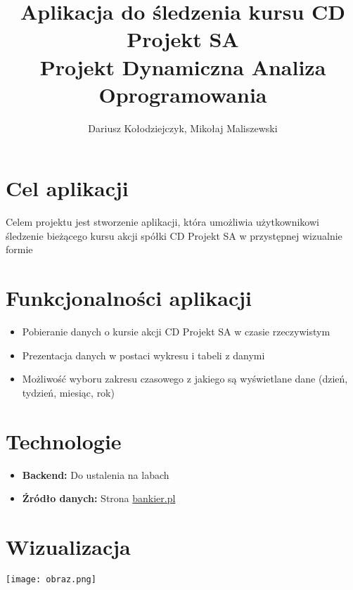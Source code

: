 \documentclass{article}
\begin{document}
		\title{Aplikacja do śledzenia kursu CD Projekt SA \\ Projekt Dynamiczna Analiza Oprogramowania}
	\author{Dariusz Kołodziejczyk, Mikołaj Maliszewski}
	\maketitle
	\section{Cel aplikacji}
	\noindent Celem projektu jest stworzenie aplikacji, która umożliwia użytkownikowi śledzenie bieżącego kursu akcji spółki CD Projekt SA w przystępnej wizualnie formie
	\section{Funkcjonalności aplikacji}
	\begin{itemize}
		\item Pobieranie danych o kursie akcji CD Projekt SA w czasie rzeczywistym
		\item Prezentacja danych w postaci wykresu i tabeli z danymi
		\item Możliwość wyboru zakresu czasowego z jakiego są wyświetlane dane (dzień, tydzień, miesiąc, rok)
	\end{itemize}
	\section{Technologie}
	\begin{itemize}
		\item \textbf {Backend:} Do ustalenia na labach
		\item \textbf{Źródło danych:} Strona \href{https://www.bankier.pl/inwestowanie/profile/quote.html?symbol=CDPROJEKT}{bankier.pl}
	\end{itemize}
		\section{Wizualizacja}
		\texttt{[image: obraz.png]}
\end{document}

